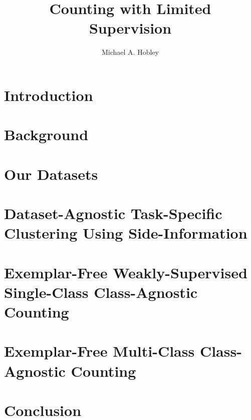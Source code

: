\documentclass[nobind]{ociamthesis}
\title{Counting with Limited \\[1ex]
Supervision}   %
\author{Michael A. Hobley}
\begin{document}
\setcounter{tocdepth}{2}
\setcounter{secnumdepth}{2} 


\maketitle   









\singlespacing
\tableofcontents
\doublespacing
\restoregeometry



\newpage
{}

\chapter{Introduction} 
\label{sec__intro}


\chapter{Background}
\label{sec__literature_review} 


\chapter{Our Datasets}
\label{sec__Datasets}


\chapter{Dataset-Agnostic Task-Specific Clustering Using Side-Information}
\label{sec__DMS}


\chapter{Exemplar-Free Weakly-Supervised Single-Class Class-Agnostic Counting}
\label{sec__LTCA}



\chapter{Exemplar-Free Multi-Class Class-Agnostic Counting}
\label{sec__ABC123}


\chapter{Conclusion}
\label{sec__conclusion}

\newpage

{
    \small
    \singlespacing
    
    
   
}  
\end{document}

